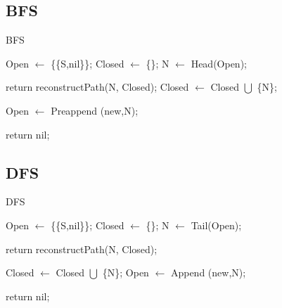 \vspace{0.75cm}
\subsection{BFS}
\begin{algorithm}[ht]
\caption{BFS}
\begin{algorithmic}
\State Open \(\gets\) \{\{S,nil\}\};
\State Closed \(\gets\) \{\};
\vspace{0.1cm}
\State N \(\gets\) Head(Open);

\vspace{0.07cm}
\State return reconstructPath(N, Closed);
\Else
\State Closed \(\gets\) Closed \(\bigcup\) \{N\};

\State Open \(\gets\) Preappend ({new,N});
\EndIf
\EndFor
\EndIf

\vspace{0.07cm}
\EndWhile

\vspace{0.1cm}
\State return nil;
\end{algorithmic}
\end{algorithm}


\newpage


\subsection{DFS}
\begin{algorithm}[ht]
\caption{DFS}
\begin{algorithmic}
\State Open \(\gets\) \{\{S,nil\}\};
\State Closed \(\gets\) \{\};
\vspace{0.1cm}
\State N \(\gets\) Tail(Open);

\vspace{0.07cm}
\State return reconstructPath(N, Closed);
\Else

\State Closed \(\gets\) Closed \(\bigcup\) \{N\};
\State Open \(\gets\) Append ({new,N});
\EndIf
\EndFor
\EndIf

\vspace{0.07cm}
\EndWhile

\vspace{0.1cm}
\State return nil;
\end{algorithmic}
\end{algorithm}



